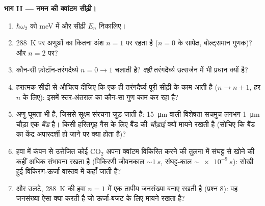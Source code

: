 \begin{problem}
\medskip\noindent\textbf{भाग II --- नमन की क्वांटम सीढ़ी।}
\begin{enumerate}[resume]
  \item $\hbar\omega_2$ को \unit{meV} में और सीढ़ी $E_n$ निकालिए।
  \item \qty{288}{K} पर अणुओं का कितना अंश $n = 1$ पर रहता है
        ($n = 0$ के सापेक्ष, बोल्ट्समान गुणक)? और
        $n = 2$ पर?
  \item कौन-सी फ़ोटॉन-तरंगदैर्घ्य $n = 0 \to 1$ चलाती है? \emph{वही}
        तरंगदैर्घ्य उत्सर्जन में भी प्रधान क्यों है?
  \item हरात्मक सीढ़ी से औचित्य दीजिए कि एक ही तरंगदैर्घ्य पूरी सीढ़ी
        के काम आती है ($n \to n + 1$, हर $n$ के लिए): इसमें
        स्तर-अंतराल का कौन-सा गुण काम कर रहा है?
  \item अणु घूमता भी है, जिससे सूक्ष्म संरचना जुड़ जाती है:
        \qty{15}{\micro m} वाली विशेषता सचमुच लगभग
        \qty{1}{\micro m} चौड़ा एक \emph{बैंड} है। किसी हरितगृह गैस
        के लिए बैंड की \emph{चौड़ाई} क्यों मायने रखती है (सोचिए कि
        बैंड का केंद्र अपारदर्शी हो जाने पर क्या होता है)?
  \item हवा में कंपन से उत्तेजित कोई CO$_2$ अपना क्वांटम विकिरित
        करने की तुलना में संघट्ट से खोने की कहीं अधिक संभावना रखता है
        (विकिरणी जीवनकाल $\sim\qty{1}{s}$, संघट्ट-काल $\sim\qty{e-9}{s}$):
        सोखी हुई विकिरण-ऊर्जा वास्तव में कहाँ जाती है?
  \item और उलटे, \qty{288}{K} की हवा $n = 1$ में एक तापीय जनसंख्या
        बनाए रखती है (प्रश्न 8): वह जनसंख्या ऐसा क्या करती है जो
        ऊर्जा-बजट के लिए मायने रखता है?
\end{enumerate}


\end{problem}
